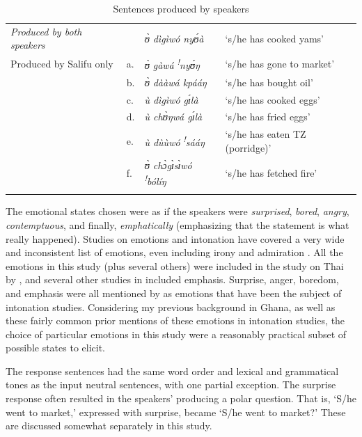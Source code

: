\documentclass[output=paper]{langsci/langscibook}
\begin{document}
\begin{table}
\begin{tabular}{llll}
\lsptoprule

\emph{\textup{Produced by both speakers}} &  & \textit{ʊ̀ dìgìwó nyʊ́à} & `s/he has cooked yams'\\
Produced by Salifu only & a. & \textit{ʊ̀ gàwá }\textit{\textsuperscript{!}}\textit{nyʊ́ŋ} & `s/he has gone to market'\\
& b. & \textit{ʊ̀ dààwá kpááŋ} & `s/he has bought oil'\\
& c. & \textit{ù dìgìwó gɪ́là} & `s/he has cooked eggs'\\
& d. & \textit{ù chʊ̀ŋwá gɪ́là} & `s/he has fried eggs'\\
& e. & \textit{ù dùùwó }\textit{\textsuperscript{!}}\textit{sááŋ} & `s/he has eaten TZ (porridge)'\\
& f. & \textit{ʊ̀ chɔ̀gɪ̀sɪ̀wó }\textit{\textsuperscript{!}}\textit{bólíŋ} & `s/he has fetched fire'  \\
\lspbottomrule
\end{tabular}

\caption{Sentences produced by speakers}
\label{tab:2.cahill}

\end{table}

The emotional states chosen were as if the speakers were \emph{surprised}, \emph{bored}, \emph{angry}, \emph{contemptuous}, and finally, \emph{emphatically} (emphasizing that the statement is what really happened). Studies on emotions and intonation have covered a very wide and inconsistent list of emotions, even including irony and admiration \citep[402]{doetal1998}. All the emotions in this study (plus several others) were included in the study on Thai by \citet{luksaneeyanawin1998}, and several other studies in \citet{hirstdicristo1998} included emphasis. Surprise, anger, boredom, and emphasis were all mentioned by \citet{ladd2008} as emotions that have been the subject of intonation studies. Considering my previous background in Ghana, as well as these fairly common prior mentions of these emotions in intonation studies, the choice of particular emotions in this study were a reasonably practical subset of possible states to elicit.

The response sentences had the same word order and lexical and grammatical tones as the input neutral sentences, with one partial exception. The surprise response often resulted in the speakers' producing a polar question. That is, `S/he went to market,' expressed with surprise, became `S/he went to market?' These are discussed somewhat separately in this study. 
\end{document}
